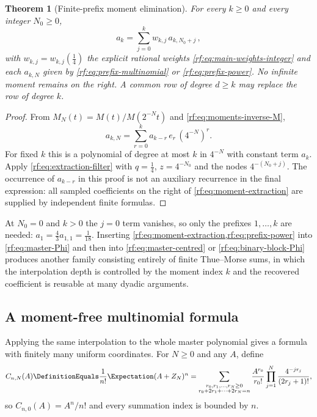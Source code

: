 \documentclass[11pt,oneside]{article}
\theoremstyle{plain}
\newtheorem{theorem}{Theorem}[section]
\theoremstyle{definition}
\theoremstyle{remark}
\newcommand{\E}{\Expectation}
\begin{document}
\begin{theorem}[Finite-prefix moment elimination]
\label{rf:thm:moment-extraction}
For every $k\ge0$ and every integer $N_{0}\ge0$,
\begin{equation}
 \boxed{\;a_{k}=\sum_{j=0}^{k}w_{k,j}\,a_{k,N_{0}+j}\,,\;}
 \label{rf:eq:moment-extraction}
\end{equation}
with $w_{k,j}=w_{k,j}(\tfrac14)$ the explicit rational weights
\cref{rf:eq:main-weights-integer} and each $a_{k,N}$ given by
\cref{rf:eq:prefix-multinomial} or \cref{rf:eq:prefix-power}.  No infinite
moment remains on the right.  A common row of degree $d\ge k$ may replace
the row of degree $k$.
\end{theorem}

\begin{proof}
From $M_{N}(t)=M(t)/M(2^{-N}t)$ and \cref{rf:eq:moments-inverse-M},
\begin{equation}
 a_{k,N}=\sum_{r=0}^{k}a_{k-r}\,e_{r}\,(4^{-N})^{r}.
 \label{rf:eq:prefix-scale-polynomial}
\end{equation}
For fixed $k$ this is a polynomial of degree at most $k$ in $4^{-N}$ with
constant term $a_{k}$.  Apply \cref{rf:eq:extraction-filter} with
$q=\tfrac14$, $z=4^{-N_{0}}$ and the nodes $4^{-(N_{0}+j)}$.  The occurrence
of $a_{k-r}$ in this proof is not an auxiliary recurrence in the final
expression: all sampled coefficients on the right of
\cref{rf:eq:moment-extraction} are supplied by independent finite formulas.
\end{proof}

At $N_{0}=0$ and $k>0$ the $j=0$ term vanishes, so only the prefixes
$1,\ldots,k$ are needed: $a_{1}=\tfrac43a_{1,1}=\tfrac1{18}$.  Inserting
\cref{rf:eq:moment-extraction,rf:eq:prefix-power} into
\cref{rf:eq:master-Phi} and then into \cref{rf:eq:master-centred} or
\cref{rf:eq:binary-block-Phi} produces another family consisting entirely of
finite Thue--Morse sums, in which the interpolation depth is controlled by
the moment index $k$ and the recovered coefficient is reusable at many
dyadic arguments.

\subsection{A moment-free multinomial formula}
\label{rf:sec:prefix-cube}

Applying the same interpolation to the whole master polynomial gives a
formula with finitely many uniform coordinates.  For $N\ge0$ and any $A$,
define
\begin{equation}
 C_{n,N}(A)\DefinitionEquals\frac{1}{n!}\E(A+Z_{N})^{n}
 =\sum_{\substack{r_{0},r_{1},\ldots,r_{N}\ge0\\ r_{0}+2r_{1}+\cdots+2r_{N}=n}}
 \frac{A^{r_{0}}}{r_{0}!}\prod_{j=1}^{N}\frac{4^{-jr_{j}}}{(2r_{j}+1)!},
 \label{rf:eq:prefix-C}
\end{equation}
so $C_{n,0}(A)=A^{n}/n!$ and every summation index is bounded by $n$.
\end{document}

